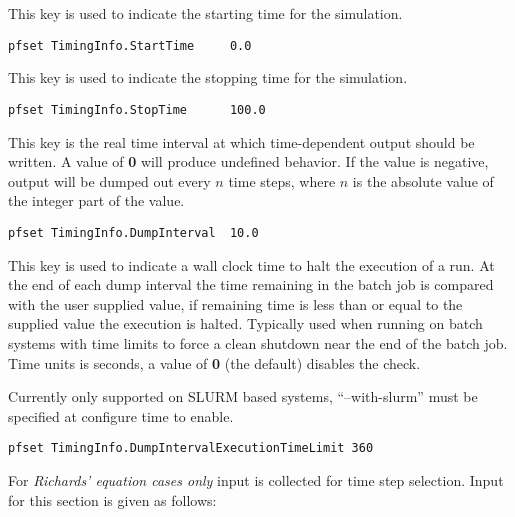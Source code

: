 {
This key is used to indicate the starting time for the simulation.
}
\begin{display}\begin{verbatim}
pfset TimingInfo.StartTime     0.0
\end{verbatim}\end{display}

{
This key is used to indicate the stopping time for the simulation.
}
\begin{display}\begin{verbatim}
pfset TimingInfo.StopTime      100.0
\end{verbatim}\end{display}

{
This key is the real time interval at which time-dependent output should
be written.  A value of {\bf 0} will produce undefined behavior.  If the
value is negative, output will be dumped out every $n$ time steps, where $n$
is the absolute value of the integer part of the value.
}
\begin{display}\begin{verbatim}
pfset TimingInfo.DumpInterval  10.0
\end{verbatim}\end{display}

{
This key is used to indicate a wall clock time to halt the execution
of a run.  At the end of each dump interval the time remaining in the
batch job is compared with the user supplied value, if remaining time
is less than or equal to the supplied value the execution is halted.
Typically used when running on batch systems with time limits to force
a clean shutdown near the end of the batch job.  Time units is
seconds, a value of {\bf 0} (the default) disables the check.

Currently only supported on SLURM based systems, ``--with-slurm'' must be specified
at configure time to enable.
}
\begin{display}\begin{verbatim}
pfset TimingInfo.DumpIntervalExecutionTimeLimit 360
\end{verbatim}\end{display}

\vspace{0.5in}

For {\em Richards' equation cases only} input is collected for time step
selection.  Input for this section is given as follows:

